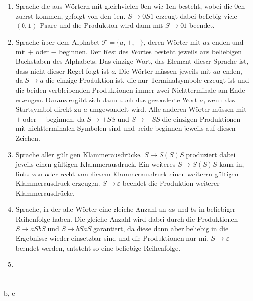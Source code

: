 \documentclass[a4paper,10pt]{scrartcl}
\begin{document}
\section{}
\begin{enumerate}
 \item	Sprache die aus Wörtern mit gleichvielen 0en wie 1en besteht, wobei die
0en zuerst kommen, gefolgt von den 1en. 
	$S \to 0S1$ erzeugt dabei beliebig viele $(0,1)$-Paare und die
Produktion wird dann mit $S \to 01$ beendet.
 \item	Sprache über dem Alphabet $\mathcal{T} = \{a,
	+, -\}$, deren Wörter mit $aa$ enden und mit $+$ oder $-$
  beginnen.
	Der Rest des Wortes besteht jeweils aus beliebigen Buchstaben des
  Alphabets.
	Das einzige Wort, das Element dieser Sprache ist, dass nicht dieser
Regel folgt ist $a$.
	Die Wörter müssen jeweils mit $aa$ enden, da $S \to a$ die einzige
	Produktion ist, die nur Terminalsymbole erzeugt ist und die beiden
	verbleibenden Produktionen immer zwei Nichtterminale am Ende erzeugen.
	Daraus ergibt sich dann auch das gesonderte Wort $a$, wenn das
Startsymbol direkt zu $a$ umgewandelt wird. 
	Alle anderen Wörter müssen mit $+$ oder $-$ beginnen, da $S \to +SS$
und $S \to -SS$ die einzigen Produktionen mit nichtterminalen Symbolen sind
 und beide beginnen jeweils auf diesen Zeichen.
 \item	Sprache aller gültigen Klammerausdrücke. $S \to S (S) S$ produziert
dabei jeveils einen gültigen Klammerausdruck. Ein weiteres $S \to S (S) S$ kann
in, links von oder recht von diesem Klammerausdruck einen weiteren gültigen
Klammerausdruck erzeugen. $S \to \varepsilon$ beendet die Produktion weiterer
Klammerausdrücke.
 \item	Sprache, in der alle Wörter eine gleiche Anzahl an $a$s und $b$s in
beliebiger Reihenfolge haben. Die gleiche Anzahl wird dabei durch die
Produktionen $S \to aSbS$ und $S \to bSaS$ garantiert, da diese dann aber
beliebig in die Ergebnisse wieder einsetzbar sind und die Produktionen nur mit
$S \to \varepsilon$ beendet werden, entsteht so eine beliebige Reihenfolge.
 \item	
\end{enumerate}

\section{}
b, e
\end{document}
